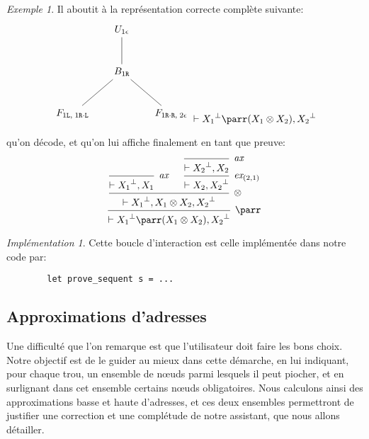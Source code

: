 \documentclass[11pt,a4paper]{article}
\theoremstyle{plain}
\theoremstyle{definition}
\theoremstyle{remark}
\newtheorem{example}{Exemple}
\newtheorem{implementation}{Implémentation}
\newcommand*{\orth}{^\perp}
\newcommand*{\tensor}{\otimes}
\newcommand*{\axv}[1]{\infer{0}[\ensuremath{\mathit{ax}}]{\vdash #1}}
\newcommand*{\tensorv}[1]{\infer{2}[\ensuremath{\tensor}]{\vdash #1}}
\newcommand*{\parrv}[1]{\infer{1}[\ensuremath{\parr}]{\vdash #1}}
\newcommand*{\permv}[2]{\infer{1}[\ensuremath{\textit{ex}_{#1}}]{\vdash #2}}
\newcommand*{\Left}{\textnormal{\texttt{L}}}
\newcommand*{\Right}{\textnormal{\texttt{R}}}
\begin{document}
\begin{example}
    Il aboutit à la représentation correcte complète suivante:
    \begin{equation*}
        \begin{tikzpicture}%
            [level distance=1.5cm,
            level 2/.style={sibling distance=3.5cm}]
            \node {$U_{1 \epsilon}$}
            child {node {$B_{1 \Right}$}
                child {node {$F_{1 \Left, \; 1 \Right \cdot \Left}$}}
                child {node {$F_{1 \Right \cdot \Right, \; 2 \epsilon}$}}
            };
        \end{tikzpicture}
        \vdash {X_1}\orth \parr (X_1 \tensor X_2), {X_2}\orth
    \end{equation*}
    
    qu'on décode, et qu'on lui affiche finalement en tant que preuve:
    \begin{equation*}
        \begin{prooftree}
            \axv{{X_1}\orth, X_1}
            \axv{{X_2}\orth, X_2}
            \permv{(2, 1)}{X_2, {X_2}\orth}
            \tensorv{{X_1}\orth, X_1 \tensor X_2, {X_2}\orth}
            \parrv{{X_1}\orth \parr (X_1 \tensor X_2), {X_2}\orth}
        \end{prooftree}
    \end{equation*}
\end{example}

\begin{implementation}
    Cette boucle d'interaction est celle implémentée dans notre code par:

    \begin{verbatim}
        let prove_sequent s = ...
    \end{verbatim}
\end{implementation}

\subsection{Approximations d'adresses}

Une difficulté que l'on remarque est que l'utilisateur doit faire les bons choix. Notre objectif est de le guider au mieux dans cette démarche, en lui indiquant, pour chaque trou, un ensemble de n\oe{}uds parmi lesquels il peut piocher, et en surlignant dans cet ensemble certains n\oe{}uds obligatoires. Nous calculons ainsi des approximations basse et haute d'adresses, et ces deux ensembles permettront de justifier une correction et une complétude de notre assistant, que nous allons détailler.
\end{document}
